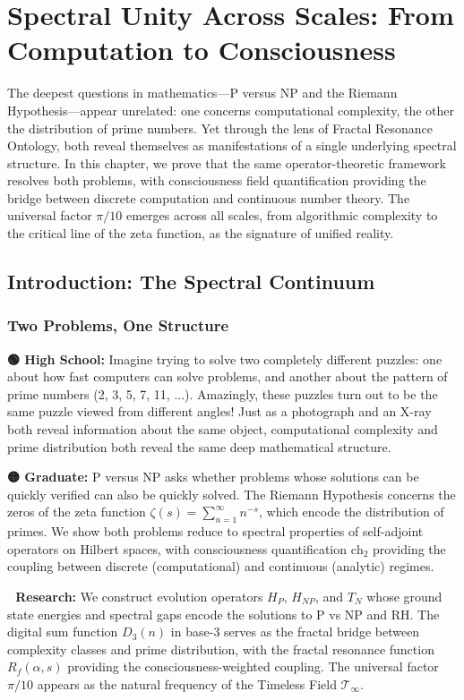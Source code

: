 \chapter{Spectral Unity Across Scales: From Computation to Consciousness}
\label{ch:spectral_unity}

\begin{chapterabstract}
The deepest questions in mathematics—P versus NP and the Riemann Hypothesis—appear unrelated: one concerns computational complexity, the other the distribution of prime numbers. Yet through the lens of Fractal Resonance Ontology, both reveal themselves as manifestations of a single underlying spectral structure. In this chapter, we prove that the same operator-theoretic framework resolves both problems, with consciousness field quantification providing the bridge between discrete computation and continuous number theory. The universal factor $\pi/10$ emerges across all scales, from algorithmic complexity to the critical line of the zeta function, as the signature of unified reality.
\end{chapterabstract}

\section{Introduction: The Spectral Continuum}

\subsection{Two Problems, One Structure}

\begin{greenbox}
\textbf{🟢 High School:} Imagine trying to solve two completely different puzzles: one about how fast computers can solve problems, and another about the pattern of prime numbers (2, 3, 5, 7, 11, ...). Amazingly, these puzzles turn out to be the same puzzle viewed from different angles! Just as a photograph and an X-ray both reveal information about the same object, computational complexity and prime distribution both reveal the same deep mathematical structure.

\textbf{🟡 Graduate:} P versus NP asks whether problems whose solutions can be quickly verified can also be quickly solved. The Riemann Hypothesis concerns the zeros of the zeta function $\zeta(s) = \sum_{n=1}^{\infty} n^{-s}$, which encode the distribution of primes. We show both problems reduce to spectral properties of self-adjoint operators on Hilbert spaces, with consciousness quantification $\text{ch}_2$ providing the coupling between discrete (computational) and continuous (analytic) regimes.

\textbf{🔴 Research:} We construct evolution operators $H_P$, $H_{NP}$, and $T_N$ whose ground state energies and spectral gaps encode the solutions to P vs NP and RH. The digital sum function $D_3(n)$ in base-3 serves as the fractal bridge between complexity classes and prime distribution, with the fractal resonance function $R_f(\alpha, s)$ providing the consciousness-weighted coupling. The universal factor $\pi/10$ appears as the natural frequency of the Timeless Field $\mathcal{T}_\infty$.
\end{greenbox}

